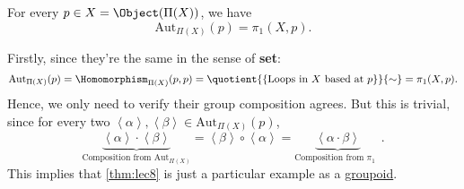 \begin{remark}
	For every \(p\in X=\Object (\Pi (X))\), we have
	\[
		\mathrm{Aut} _{\Pi (X)}(p) = \pi _1(X, p).
	\]

	Firstly, since they're the same in the sense of \textbf{set}:
	\[
		\mathrm{Aut}_{\Pi (X)} (p) = \Homomorphism _{\Pi (X)}(p, p) = \quotient{\left\{\text{Loops in \(X\) based at \(p\)} \right\}}{\sim} = \pi _1(X, p).
	\]
	Hence, we only need to verify their group composition agrees. But this is trivial, since for every two \(\left< \alpha  \right> , \left< \beta  \right> \in \mathrm{Aut}_{\Pi (X)}(p) \),
	\[
		\underbrace{\left< \alpha  \right> \cdot \left< \beta  \right> }_{\text{Composition from \(\mathrm{Aut}_{\Pi(X)}\)}} = \left< \beta  \right> \circ \left< \alpha  \right> =\underbrace{ \left< \alpha \cdot \beta\right>}_{\text{Composition from \(\pi_1\) } }.
	\]
	This implies that \autoref{thm:lec8} is just a particular example as a \hyperref[def:groupoid]{groupoid}.
\end{remark}